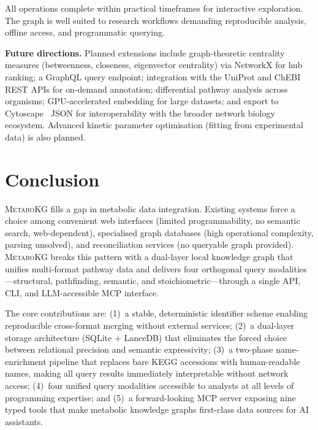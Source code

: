 \documentclass[10pt]{article}
\begin{document}
All operations complete within practical timeframes for interactive
exploration. The graph is well suited to research workflows demanding
reproducible analysis, offline access, and programmatic querying.

\textbf{Future directions.} Planned extensions include graph-theoretic
centrality measures (betweenness, closeness, eigenvector centrality) via
NetworkX for hub ranking; a GraphQL query endpoint; integration with the
UniProt and ChEBI REST APIs for on-demand annotation; differential pathway
analysis across organisms; GPU-accelerated embedding for large datasets; and
export to Cytoscape~\citep{shannon2003cytoscape} JSON for interoperability
with the broader network biology ecosystem. Advanced kinetic parameter
optimisation (fitting from experimental data) is also planned.

\section{Conclusion}
\label{sec:conclusion}

\textsc{MetaboKG} fills a gap in metabolic data integration. Existing systems
force a choice among convenient web interfaces (limited programmability, no
semantic search, web-dependent), specialised graph databases (high operational
complexity, parsing unsolved), and reconciliation services (no queryable graph
provided). \textsc{MetaboKG} breaks this pattern with a dual-layer local
knowledge graph that unifies multi-format pathway data and delivers four
orthogonal query modalities---structural, pathfinding, semantic, and
stoichiometric---through a single API, CLI, and LLM-accessible MCP interface.

The core contributions are: (1)~a stable, deterministic identifier scheme
enabling reproducible cross-format merging without external services; (2)~a
dual-layer storage architecture (SQLite + LanceDB) that eliminates the forced
choice between relational precision and semantic expressivity; (3)~a
two-phase name-enrichment pipeline that replaces bare KEGG accessions with
human-readable names, making all query results immediately interpretable
without network access; (4)~four unified query modalities accessible to
analysts at all levels of programming expertise; and (5)~a forward-looking
MCP server exposing nine typed tools that make metabolic knowledge graphs
first-class data sources for AI assistants.
\end{document}
